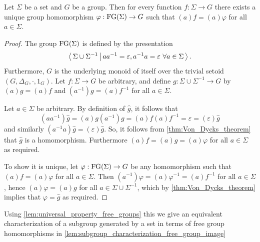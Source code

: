 \begin{lemma}%
  \label{lem:universal_property_free_groups}
  \rocqok{}
  Let $\Sigma$ be a set and $G$ be a group. Then for every function $f: \Sigma\rightarrow G$
  there exists a unique group homomorphism $\varphi: \textrm{FG}(\Sigma) \rightarrow G$ such that
  $(a)f = (a)\varphi$ for all $a\in \Sigma$.
\end{lemma}
\begin{proof}
  \rocqok{}
  The group $\textrm{FG}(\Sigma)$ is defined by the presentation
  \[
    \left\langle\, \Sigma \cup \Sigma^{-1} \,\middle|\, aa^{-1} = \varepsilon, a^{-1}a = \varepsilon\ \forall a\in \Sigma \,\right\rangle.
  \]
  Furthermore, $G$ is the underlying monoid of itself over the trivial setoid $(G, \Delta_G, \cdot , 1_G)$.
  Let $f:\Sigma \rightarrow G$ be arbitrary, and define $g: \Sigma\cup \Sigma^{-1}\rightarrow G$
  by $(a)g = (a)f$ and $(a^{-1})g = (a)f^{-1}$ for all $a \in \Sigma$.

  Let $a\in \Sigma$ be arbitrary. By definition of $\widehat{g}$, it follows that
  \[
    (aa^{-1})\widehat{g} = (a)g(a^{-1})g = (a)f(a)f^{-1} = \varepsilon = (\varepsilon) \widehat{g}
  \]
  and similarly $(a^{-1}a)\widehat{g} = (\varepsilon)\widehat{g}$.
  So, it follows from \cref{thm:Von_Dycks_theorem} that $\widehat{g}$ is a homomorphism.
  Furthermore $(a)f = (a)g = (a)\varphi$ for all $a\in \Sigma$ as required.

  To show it is unique, let $\varphi: \textrm{FG}(\Sigma) \rightarrow G$ be any homomorphism such that
  $(a)f = (a)\varphi$ for all $a\in\Sigma$. Then $(a^{-1})\varphi = (a)\varphi^{-1} = (a)f^{-1}$
  for all $a\in \Sigma$, hence $(a)\varphi = (a)g$ for all $a\in \Sigma\cup \Sigma^{-1}$, which
  by \cref{thm:Von_Dycks_theorem} implies that $\varphi = \widehat{g}$ as required.
\end{proof}

Using \cref{lem:universal_property_free_groups} this we give an equivalent characterization of a
subgroup generated by a set in terms of free group homomorphisms in
\cref{lem:subgroup_characterization_free_group_image}

